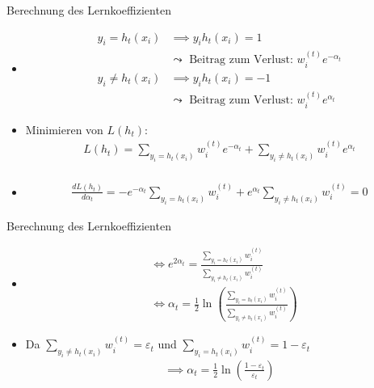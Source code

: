 \documentclass[hyperref={bookmarks=false},11pt,dvipsnames]{beamer}
\begin{document}
\begin{frame}[t]{Berechnung des Lernkoeffizienten}
	\begin{itemize}
		\item <1-> [] \begin{align*}
			      y_i = h_t(x_i)    & \implies y_ih_t(x_i)  = 1                                     \\
			                        & \leadsto \text{ Beitrag zum Verlust: } w_i^{(t)}e^{-\alpha_t} \\
			      y_i \neq h_t(x_i) & \implies y_ih_t(x_i)  = -1                                    \\
			                        & \leadsto \text{ Beitrag zum Verlust: } w_i^{(t)}e^{\alpha_t}
		      \end{align*}
		\item <2-> Minimieren von $L(h_t)$:\begin{align*}
			      L(h_t) = \sum_{y_i=h_t(x_i)}w_i^{(t)}e^{-\alpha_t} + \sum_{y_i\neq h_t(x_i)} w_i^{(t)}e^{\alpha_t} \\
		      \end{align*}
		\item<3->[] \begin{align*}
			      \frac{dL(h_t)}{d\alpha_t} = -e^{-\alpha_t}\sum_{y_i=h_t(x_i)}w_i^{(t)} + e^{\alpha_t}\sum_{y_i\neq h_t(x_i)}w_i^{(t)} = 0
		      \end{align*}
	\end{itemize}
\end{frame}

\begin{frame}[t]{Berechnung des Lernkoeffizienten}
	\begin{itemize}
		\item <1-> [] \begin{align*}
			       & \Leftrightarrow e^{2\alpha_t} = \frac{\sum_{y_i=h_t(x_i)}w_i^{(t)}}{\sum_{y_i\neq h_t(x_i)}w_i^{(t)}}                       \\
			       & \Leftrightarrow \alpha_t = \frac{1}{2}\ln\left(\frac{\sum_{y_i=h_t(x_i)}w_i^{(t)}}{\sum_{y_i\neq h_t(x_i)}w_i^{(t)}}\right)
		      \end{align*}
		\item<2-> Da $\sum_{y_i\neq h_t(x_i)}w_i^{(t)}=\varepsilon_t$ und $\sum_{y_i=h_t(x_i)}w_i^{(t)}=1-\varepsilon_t$
		      \begin{align*}
			      \implies \alpha_t =\frac{1}{2}\ln\left(\frac{1-\varepsilon_t}{\varepsilon_t}\right)
		      \end{align*}
	\end{itemize}
\end{frame}
\end{document}
